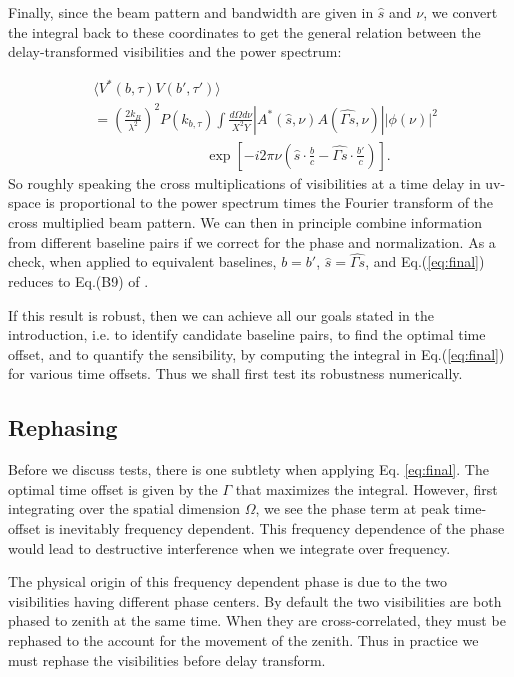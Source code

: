 \documentclass[preprint2,numberedappendix,tighten,twocolappendix]{aastex6}  %
\renewcommand\[{\begin{equation}}
\renewcommand\]{\end{equation}}
\begin{document}
Finally, since the beam pattern and bandwidth are given in $\hat{s}$
and $\nu$, we convert the integral back to these coordinates to get
the general relation between the delay-transformed visibilities and
the power spectrum:

\begin{equation}
\begin{aligned} & \langle V^{*}(b,\tau)V(b',\tau')\rangle\\
 & =\left(\frac{2k_{B}}{\lambda^{2}}\right)^{2}P(k_{b,\tau})\int\frac{d\Omega d\nu}{X^{2}Y}|A^{*}(\hat{s},\nu)A(\hat{\Gamma s},\nu)||\phi(\nu)|^{2}\\
 & \qquad \qquad \qquad \qquad \exp\left[-i2\pi\nu\left(\hat{s}\cdot\frac{b}{c}-\hat{\Gamma s}\cdot\frac{b'}{c}\right)\right].\end{aligned}
\label{eq:final}
\end{equation}
So roughly speaking the cross multiplications of visibilities at a time delay
in uv-space is proportional to the power spectrum times the Fourier
transform of the cross multiplied beam pattern. We can then in principle
combine information from different baseline pairs if we correct for
the phase and normalization. As a check, when applied to equivalent baselines,
$b=b'$, $\hat{s}=\hat{\Gamma s}$, and Eq.(\ref{eq:final}) reduces to Eq.(B9) of \cite{paper32}. 

If this result is robust, then we can achieve all our goals stated in the introduction, i.e. to identify 
candidate baseline pairs, to find the optimal time offset, and to quantify the sensibility, by computing the integral
in Eq.(\ref{eq:final}) for various time offsets. Thus we shall first test its robustness numerically.

\subsection{Rephasing \label{sec:rephs}}
Before we discuss tests, there is one subtlety when applying Eq. \ref{eq:final}. The optimal time offset is given by the $\Gamma$ that maximizes the integral. However, first integrating over the spatial dimension $\Omega$, we see the phase term at peak time-offset is inevitably frequency dependent. This frequency dependence of the phase would lead to destructive interference when we integrate over frequency.

The physical origin of this frequency dependent phase is due to the two visibilities having different phase centers. By default the two visibilities are both phased to zenith at the same time. When they are cross-correlated, they must be rephased to the account for the movement of the zenith. Thus in practice we must rephase the visibilities before delay transform. 
\end{document}
